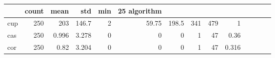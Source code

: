 \begin{tabular}{lrrrrrrrrr}
\toprule
 & count & mean & std & min & 25%
algorithm &  &  &  &  &  &  &  &  &  \\
\midrule
cup & 250 & 203 & 146.7 & 2 & 59.75 & 198.5 & 341 & 479 & 1 \\
cas & 250 & 0.996 & 3.278 & 0 & 0 & 0 & 1 & 47 & 0.36 \\
cor & 250 & 0.82 & 3.204 & 0 & 0 & 0 & 1 & 47 & 0.316 \\
\bottomrule
\end{tabular}
